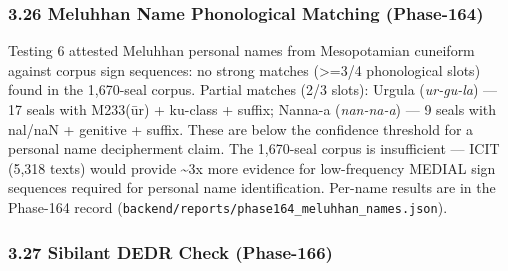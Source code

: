 \documentclass[
]{article}
\begin{document}
\subsubsection{3.26 Meluhhan Name Phonological Matching
(Phase-164)}\label{meluhhan-name-phonological-matching-phase-164}

Testing 6 attested Meluhhan personal names from Mesopotamian cuneiform
against corpus sign sequences: no strong matches (\textgreater{}=3/4 phonological
slots) found in the 1,670-seal corpus. Partial matches (2/3 slots):
Urgula (\emph{ur-gu-la}) --- 17 seals with M233(ūr) + ku-class + suffix;
Nanna-a (\emph{nan-na-a}) --- 9 seals with nal/naN + genitive + suffix.
These are below the confidence threshold for a personal name
decipherment claim. The 1,670-seal corpus is insufficient --- ICIT (5,318 texts) would provide \textasciitilde3x more evidence for low-frequency MEDIAL sign sequences required for personal name identification. Per-name results are in the Phase-164 record (\texttt{backend/reports/phase164\_meluhhan\_names.json}).

\subsubsection{3.27 Sibilant DEDR Check (Phase-166)}\label{sibilant-dedr-cross-validation-phase-166}
\end{document}
